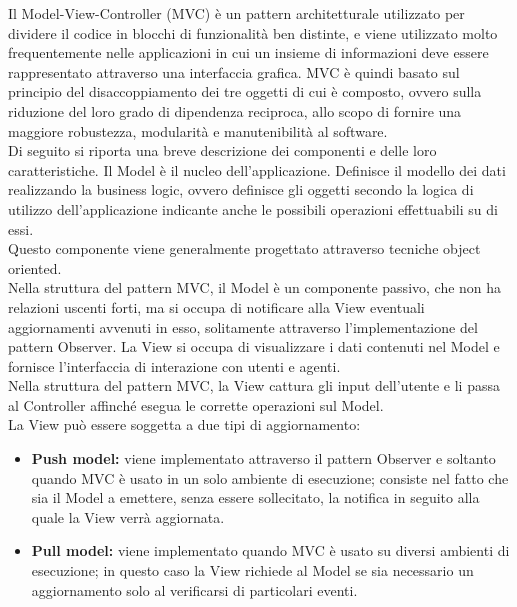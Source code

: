  \label{app:designpattern}
	 \label{app:MVC}
		Il Model-View-Controller (MVC) è un pattern architetturale utilizzato per dividere il codice in blocchi di funzionalità ben distinte, e viene utilizzato molto frequentemente nelle applicazioni in cui un insieme di informazioni deve essere rappresentato attraverso una interfaccia grafica.
			MVC è quindi basato sul principio del disaccoppiamento dei tre oggetti di cui è composto, ovvero sulla riduzione del loro grado di dipendenza reciproca, allo scopo di fornire una maggiore robustezza, modularità e manutenibilità al software.\\
			Di seguito si riporta una breve descrizione dei componenti e delle loro caratteristiche. 
				Il Model è il nucleo dell'applicazione. Definisce il modello dei dati realizzando la business logic, ovvero definisce gli oggetti secondo la logica di utilizzo dell'applicazione indicante anche le possibili operazioni effettuabili su di essi.\\
				Questo componente viene generalmente progettato attraverso tecniche object oriented.\\
				Nella struttura del pattern MVC, il Model è un componente passivo, che non ha relazioni uscenti forti, ma si occupa di notificare alla View eventuali aggiornamenti avvenuti in esso, solitamente attraverso l'implementazione del pattern Observer.
				La View si occupa di visualizzare i dati contenuti nel Model e fornisce l'interfaccia di interazione con utenti e agenti.\\
				Nella struttura del pattern MVC, la View cattura gli input dell'utente e li passa al Controller affinché esegua le corrette operazioni sul Model. \\
				La View può essere soggetta a due tipi di aggiornamento:
				\begin{itemize}
					\item \textbf{Push model:} viene implementato attraverso il pattern Observer e soltanto quando MVC è usato in un solo ambiente di esecuzione; consiste nel fatto che sia il Model a emettere, senza essere sollecitato, la notifica in seguito alla quale la View verrà aggiornata.
					\item \textbf{Pull model:} viene implementato quando MVC è usato su diversi ambienti di esecuzione; in questo caso la View richiede al Model se sia necessario un aggiornamento solo al verificarsi di particolari eventi.
				\end{itemize}
